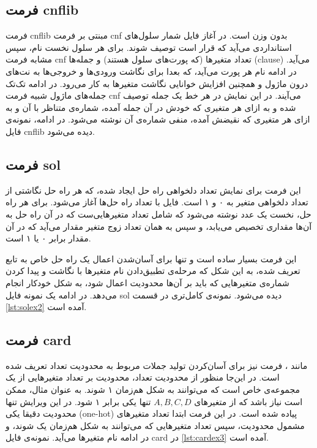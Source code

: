 \documentclass{article}
\begin{document}
\subsection{فرمت cnflib}\label{section:cnflib}

فرمت cnflib مبنتی بر فرمت cnf بدون وزن است. در آغاز فایل شمار سلول‌های استانداردی می‌آید که قرار است توصیف شوند. برای هر سلول نخست نام، سپس مشابه فرمت cnf تعداد متغیرها (که پورت‌های سلول هستند) و جمله‌ها (clause) می‌آید. در ادامه نام هر پورت می‌آید، که بعدا برای نگاشت ورودی‌ها و خروجی‌ها به نت‌های درون ماژول و همچنین افزایش خوانایی نگاشت متغیرها به کار می‌رود. در ادامه تک‌تک جمله‌های ماژول شبیه فرمت cnf می‌آیند. در این نمایش در هر خط یک جمله توصیف شده و به ازای هر متغیری که خودش در آن جمله آمده، شماره‌ی متناظر با آن و به ازای هر متغیری که نقیضش آمده، منفی شماره‌ی آن نوشته می‌شود.  در ادامه، نمونه‌ی فایل cnflib دیده می‌شود.

\lr{}

\subsection{فرمت sol}\label{section:sol}
این فرمت برای نمایش تعداد دلخواهی راه حل ایجاد شده، که هر راه حل نگاشتی از تعداد دلخواهی متغیر به ۰ و ۱ است. فایل با تعداد راه حل‌ها آغاز می‌شود. برای هر راه حل، نخست یک عدد نوشته می‌شود که شامل تعداد متغیرهایی‌ست که در آن راه حل به آن‌ها مقداری تخصیص می‌یابد، و سپس به همان تعداد زوج {متغیر مقدار} می‌آید که در آن مقدار برابر ۰ یا ۱ است. 

این فرمت بسیار ساده است و تنها برای آسان‌شدن اعمال یک راه حل خاص به تابع تعریف شده، به این شکل که مرحله‌ی تطبیق‌دادن نام متغیرها با نگاشت و پیدا کردن شماره‌ی متغیرهایی که باید بر آن‌ها محدودیت اعمال شود، به شکل خودکار انجام می‌دهد. در ادامه یک نمونه فایل sol دیده می‌شود. نمونه‌ی کامل‌تری در قسمت \ref{lst:solex2} آمده است.

\begin{LTR}{}\end{LTR}

\subsection{فرمت card}\label{section:card}
مانند ، فرمت  نیز برای آسان‌کردن تولید جملات مربوط به محدودیت تعداد تعریف شده است. در این‌جا منظور از محدودیت تعداد، محدودیت بر تعداد متغیرهایی از یک مجموعه‌ی خاص است که می‌توانند به شکل هم‌زمان ۱ شوند. به عنوان مثال، ممکن است نیاز باشد که از متغیرهای ${ A, B, C, D }$ تنها یکی برابر ۱ شود. در این ویرایش تنها محدودیت دقیقا یکی (one-hot) پیاده شده است. 
در این فرمت ابتدا تعداد متغیرهای مشمول محدودیت، سپس تعداد متغیرهایی که می‌توانند به شکل هم‌زمان یک شوند، و در ادامه نام متغیرها می‌آید. نمونه‌ی فایل card در \ref{lst:cardex3} آمده است.
\end{document}
